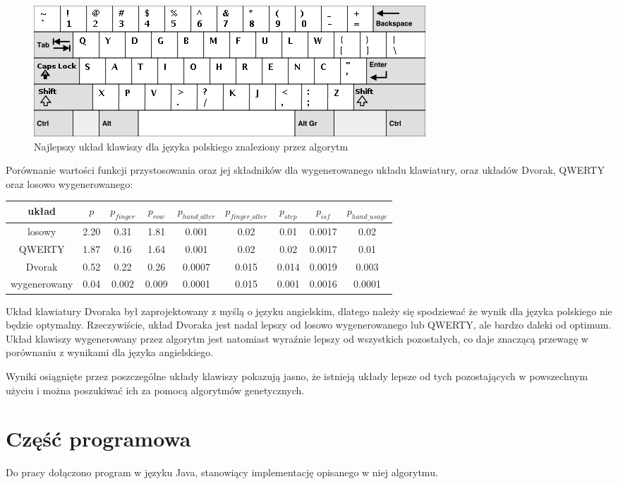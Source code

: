 \documentclass[brudnopis]{xmgr}
\begin{document}
\begin{figure}[!tbh]
\centering
\includegraphics[width=.8\hsize]{fig/best_en}
\caption{Najlepszy układ klawiszy dla języka polskiego znaleziony przez algorytm}
\end{figure}

Porównanie wartości funkcji przystosowania oraz jej składników dla wygenerowanego układu klawiatury, oraz układów Dvorak, QWERTY oraz losowo wygenerowanego:\newline
\begin{tabular}{ c | c | c | c | c | c | c | c | c }
  układ & $p$ & $p_{finger}$ & $p_{row}$ & $p_{hand\_alter}$ & $p_{finger\_alter}$ & $p_{step}$ & $p_{isf}$ & $p_{hand\_usage}$ \\
  \hline
  losowy       & 2.20 & 0.31 & 1.81 & 0.001 & 0.02 & 0.01 & 0.0017 & 0.02 \\
  QWERTY       & 1.87 & 0.16 & 1.64 & 0.001 & 0.02 & 0.02 & 0.0017 & 0.01  \\
  Dvorak       & 0.52 & 0.22 & 0.26 & 0.0007 & 0.015 & 0.014 & 0.0019 & 0.003  \\
  wygenerowany & 0.04 & 0.002 & 0.009 & 0.0001 & 0.015 & 0.001 & 0.0016 & 0.0001  \\
\end{tabular}\newline\newline

Układ klawiatury Dvoraka był zaprojektowany z myślą o języku angielskim, dlatego należy się spodziewać że wynik dla języka polskiego nie będzie optymalny. Rzeczywiście, układ Dvoraka jest nadal lepszy od losowo wygenerowanego lub QWERTY, ale bardzo daleki od optimum. Układ klawiszy wygenerowany przez algorytm jest natomiast wyraźnie lepszy od wszystkich pozostałych, co daje znaczącą przewagę w porównaniu z wynikami dla języka angielskiego.


\summary
Wyniki osiągnięte przez poszczególne układy klawiszy pokazują jasno, że istnieją układy lepsze od tych pozostających w powszechnym użyciu i można poszukiwać ich za pomocą algorytmów genetycznych.

\appendix
\chapter{Część programowa}

Do pracy dołączono program w języku Java, stanowiący implementację opisanego w niej algorytmu.




\listoftables

\listoffigures

\oswiadczenie
\end{document}
